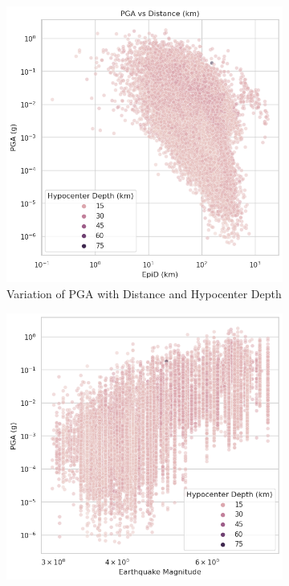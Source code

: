 \documentclass[a4paper,10pt]{article}
\begin{document}
\begin{figure}[h]
     \centering
     \begin{subfigure}[b]{0.45\textwidth}
         \centering
         \includegraphics[width=\textwidth]{PGA_distance_Depth}
         \caption{Variation of PGA with Distance and Hypocenter Depth}
     \end{subfigure}
     \hfill
     \begin{subfigure}[b]{0.45\textwidth}
         \centering
         \includegraphics[width=\textwidth]{PGA_Mag_Depth}

\end{subfigure}
\end{figure}
\end{document}
